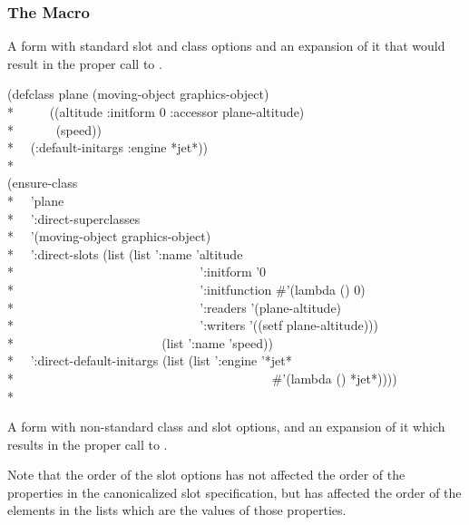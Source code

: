 \subsubsection{The  Macro}

A  form with standard slot and class options and an expansion of it that
would result in the proper call to .

\begin{lisp}
(defclass plane (moving-object graphics-object)\\*
~~~~~((altitude :initform 0 :accessor plane-altitude)\\*
~~~~~~(speed))\\*
~~(:default-initargs :engine *jet*))\\*
\\
(ensure-class\\*
~~'plane\\*
~~':direct-superclasses\\*
~~'(moving-object graphics-object)\\*
~~':direct-slots (list (list ':name 'altitude\\*
~~~~~~~~~~~~~~~~~~~~~~~~~~~~ ':initform '0\\*
~~~~~~~~~~~~~~~~~~~~~~~~~~~~ ':initfunction \#'(lambda () 0)\\*
~~~~~~~~~~~~~~~~~~~~~~~~~~~~ ':readers '(plane-altitude)\\*
~~~~~~~~~~~~~~~~~~~~~~~~~~~~ ':writers '((setf plane-altitude)))\\*
~~~~~~~~~~~~~~~~~~~~~~ (list ':name 'speed))\\*
~~':direct-default-initargs (list (list ':engine '*jet* \\*
~~~~~~~~~~~~~~~~~~~~~~~~~~~~~~~~~~~~~~~~\#'(lambda () *jet*))))\\*
\end{lisp}

A  form with non-standard class and slot options, and an
  expansion of it which results in the proper call to .

Note that the order of the slot options has not affected the order of the
properties in the canonicalized slot specification, but has affected the order
of the elements in the lists which are the values of those properties. 

